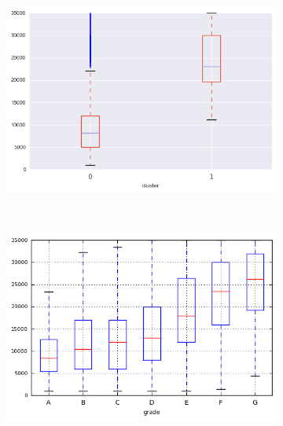 \begin{anexosenv}
\begin{figure}[t!]
\begin{subfigure}[t]{0.45\textwidth}
            \centerline{\includegraphics[width=1.05\textwidth]{img/loan_amnt_by_cluster}}
        \end{subfigure}%
        ~ 
        \begin{subfigure}[t]{0.45\textwidth}
            \centering
   
            \centerline{\includegraphics[width=1.05\textwidth]{img/loan_amnt_by_grade}}

        \end{subfigure}
\\
                \caption{\emph{Boxplots} de int\textunderscore rate\textunderscore float}
        \begin{subfigure}[t]{0.45\textwidth}
            \centering


\end{subfigure}
\end{figure}
\end{anexosenv}
